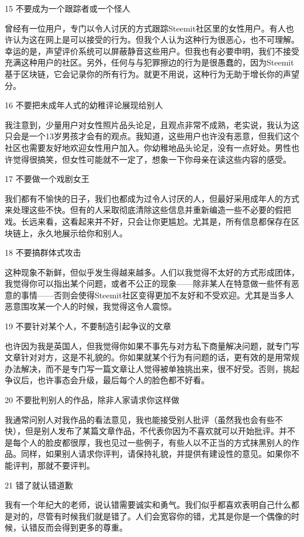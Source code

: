 \documentclass[]{ctexbook}
\begin{document}
15 不要成为一个跟踪者或一个怪人

曾经有一位用户，专门以令人讨厌的方式跟踪Steemit社区里的女性用户。有人也许认为这在网上是可以接受的行为。但我个人认为这种行为很恶心，也不可理解。幸运的是，声望评价系统可以屏蔽静音这些用户。但我也有必要申明，我们不接受充满这种用户的社区。另外，任何与与犯罪擦边的行为是很愚蠢的，因为Steemit基于区块链，它会记录你的所有行为。就更不用说，这种行为无助于增长你的声望分。

16 不要把未成年人式的幼稚评论展现给别人

我注意到，少量用户对女性照片品头论足，且观点非常不成熟，老实说，我认为这只会是一个13岁男孩才会有的观点。我知道，这些用户也许没有恶意，但我们这个社区也需要友好地欢迎女性用户加入。你幼稚地品头论足，没有一点好处。男性也许觉得很搞笑，但女性可能就不一定了，想象一下你母亲在读这些内容的感受。

17 不要做一个戏剧女王

我们都有不愉快的日子，我们也都成为过令人讨厌的人，但最好采用成年人的方式来处理这些不快。但有的人采取彻底清除这些信息并重新编造一些不必要的假把戏。长远来看，这看起来并不好，只会让你更尴尬。尤其是，所有信息都保存在区块链上，永久地展示给你和别人。

18 不要搞群体式攻击

这种现象不新鲜，但似乎发生得越来越多。人们以我觉得不太好的方式形成团体，我觉得你可以指出某个问题，或者不公正的现象------除非某人在特意做一些怀有恶意的事情------否则会使得Steemit社区变得更加不友好和不受欢迎。尤其是当多人恶意围攻某一个人的时候，我觉得这令人震惊。

19 不要针对某个人，不要制造引起争议的文章

也许因为我是英国人，但我觉得你如果不事先与对方私下商量解决问题，就专门写文章针对对方，这是不礼貌的。你如果就某个行为有问题的话，更有效的是用常规办法解决，而不是专门写一篇文章让人觉得被单独挑出来，很不好受。否则，挑起争议后，也许事态会升级，最后每个人的脸色都不好看。

20 不要批判别人的作品，除非人家请求你这样做

我通常问别人对我作品的看法意见，我也能接受别人批评（虽然我也会有些不快），但是别人发布了某篇文章作品，不代表你因为不喜欢就可以开始批评。并不是每个人的脸皮都很厚，我也见过一些例子，有些人以不正当的方式抹黑别人的作品。同样，如果别人请求你评判，请保持礼貌，并提供有建设性的意见。如果你不能评判，那就不要评判。

21 错了就认错道歉

我有一个年纪大的老师，说认错需要诚实和勇气。我们似乎都喜欢表明自己什么都是对的，尽管有时候我们就是错了。人们会宽容你的错，尤其是你是一个偶像的时候，认错反而会得到更多的尊重。
\end{document}
